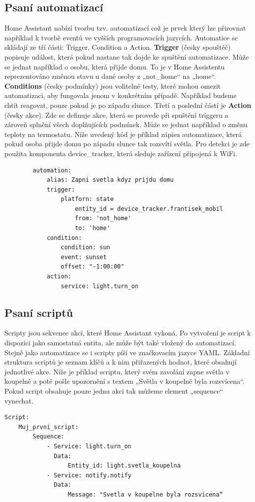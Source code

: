 \documentclass[a4paper,12pt,czech,bibliography=totoc]{scrbook}
\begin{document}
	\subsection{Psaní automatizací}
	Home Assistant nabízí tvorbu tzv. automatizací což je prvek který lze přirovnat například k tvorbě eventů ve vyšších programovacích jazycích.
	Automatice se skládají ze tří části: Trigger, Condition a Action.
	\newline
	\textbf{Trigger} (česky spouštěč) popisuje událost, která pokud nastane tak dojde ke spuštění automatizace. Může se jednat například o osobu, která přijde domu. To je v Home Assistentu reprezentováno změnou stavu u dané osoby z „not\_home“ na „home“.
	\newline
	\textbf{Conditions} (česky podmínky) jsou volitelné testy, které mohou omezit automatizaci, aby fungovala jenom v konkrétním případě. Například budeme chtít reagovat, pouze pokud je po západu slunce.
	\newline
	Třetí a poslední částí je \textbf{Action} (česky akce). Zde se definuje akce, která se provede při spuštění triggeru a zároveň splnění všech doplňujících podmínek. Může se jednat například o změnu teploty na termostatu.
	\newline
	Níže uvedený kód je příklad zápisu automatizace, která pokud osoba přijde domu po západu slunce tak rozsvítí světla. Pro detekci je zde použita komponenta device\_tracker, která sleduje zařízení připojená k WiFi.
	\begin{lstlisting}
		automation:
			alias: Zapni svetla kdyz prijdu domu
			trigger:
				platforn: state
					entity_id = device_tracker.frantisek_mobil
					from: 'not_home'
					to: 'home'
			condition:
				condition: sun
				event: sunset
				offset: "-1:00:00"
			action:
				service: light.turn_on
	\end{lstlisting}
	\subsection{Psaní scriptů}
	Scripty jsou sekvence akcí, které Home Assistant vykoná. Po vytvoření je script k dispozici jako samostatná entita, ale může být také vložený do automatizací. Stejně jako automatizace se i scripty píší ve značkovacím jazyce YAML. Základní struktura scriptů je seznam klíčů a k nim přiřazených hodnot, které obsahují jednotlivé akce.
	\newline
	Níže je příklad scriptu, který svém zavolání zapne světla v koupelně a poté pošle upozornění s textem „Světla v koupelně byla rozsvícena“. Pokud script obsahuje pouze jednu akci tak můžeme element „sequence“ vynechat.
		\begin{lstlisting}
Script:
	Muj_prvni_script:
		Sequence:
			- Service: light.turn_on
			  Data:
				  Entity_id: light.svetla_koupelna
			- Service: notify.notify
			  Data:
				  Message: "Svetla v koupelne byla rozsvicena“ 
	\end{lstlisting}
	
\end{document}
